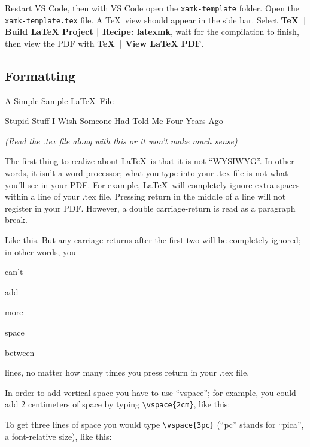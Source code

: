 Restart VS Code, then with VS Code open the \texttt{xamk-template} folder.
Open the \texttt{xamk-template.tex} file.
A \TeX\ view should appear in the side bar.
Select \textbf{\TeX\ | Build LaTeX Project | Recipe: latexmk}, wait for the compilation to finish, then view the PDF with \textbf{\TeX\ | View LaTeX PDF}.

\subsection{Formatting}

{\centering\sc \large A Simple Sample \LaTeX\ File \parencite{formatting}\par}
\centerline{\sc Stupid Stuff I Wish Someone Had Told Me Four Years Ago}
\centerline{\it (Read the .tex file along with this or it won't make much sense)}

The first thing to realize about \LaTeX\ is that it is not ``WYSIWYG''.
In other words, it isn't a word processor; what you type into your .tex file is not what you'll see in your PDF.
For example, \LaTeX\ will      completely     ignore               extra    spaces    within                             a line of your .tex file.
Pressing return
in
the
middle
of
a
line
will not register in your PDF.
However, a double carriage-return is read as a paragraph break.

Like this.
But any carriage-returns after the first two will be completely ignored; in other words, you


can't

add






more




space


between




lines, no matter how many times you press return in your .tex file.

In order to add vertical space you have to use ``vspace''; for example, you could add 2 centimeters of space by typing \verb|\vspace{2cm}|, like this:
\vspace{2cm}

To get three lines of space you would type \verb|\vspace{3pc}| (``pc'' stands for ``pica'', a font-relative size), like this:
\vspace{3pc}


